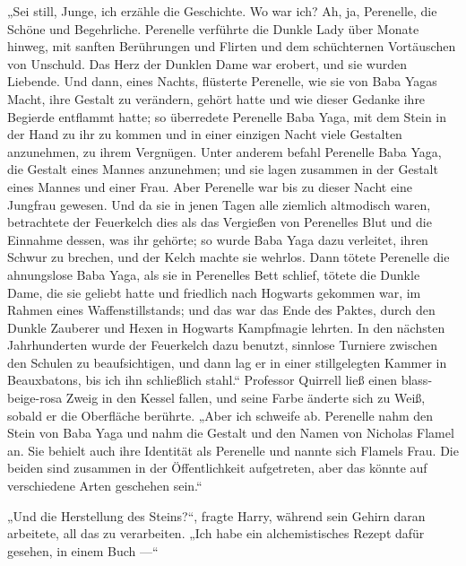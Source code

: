 „Sei still, Junge, ich erzähle die Geschichte. Wo war ich? Ah, ja, Perenelle, die Schöne und Begehrliche. Perenelle verführte die Dunkle Lady über Monate hinweg, mit sanften Berührungen und Flirten und dem schüchternen Vortäuschen von Unschuld. Das Herz der Dunklen Dame war erobert, und sie wurden Liebende. Und dann, eines Nachts, flüsterte Perenelle, wie sie von Baba Yagas Macht, ihre Gestalt zu verändern, gehört hatte und wie dieser Gedanke ihre Begierde entflammt hatte; so überredete Perenelle Baba Yaga, mit dem Stein in der Hand zu ihr zu kommen und in einer einzigen Nacht viele Gestalten anzunehmen, zu ihrem Vergnügen. Unter anderem befahl Perenelle Baba Yaga, die Gestalt eines Mannes anzunehmen; und sie lagen zusammen in der Gestalt eines Mannes und einer Frau. Aber Perenelle war bis zu dieser Nacht eine Jungfrau gewesen. Und da sie in jenen Tagen alle ziemlich altmodisch waren, betrachtete der Feuerkelch dies als das Vergießen von Perenelles Blut und die Einnahme dessen, was ihr gehörte; so wurde Baba Yaga dazu verleitet, ihren Schwur zu brechen, und der Kelch machte sie wehrlos. Dann tötete Perenelle die ahnungslose Baba Yaga, als sie in Perenelles Bett schlief, tötete die Dunkle Dame, die sie geliebt hatte und friedlich nach Hogwarts gekommen war, im Rahmen eines Waffenstillstands; und das war das Ende des Paktes, durch den Dunkle Zauberer und Hexen in Hogwarts Kampfmagie lehrten. In den nächsten Jahrhunderten wurde der Feuerkelch dazu benutzt, sinnlose Turniere zwischen den Schulen zu beaufsichtigen, und dann lag er in einer stillgelegten Kammer in Beauxbatons, bis ich ihn schließlich stahl.“
Professor Quirrell ließ einen blass-beige-rosa Zweig in den Kessel fallen, und seine Farbe änderte sich zu Weiß, sobald er die Oberfläche berührte.
„Aber ich schweife ab. Perenelle nahm den Stein von Baba Yaga und nahm die Gestalt und den Namen von Nicholas Flamel an. Sie behielt auch ihre Identität als Perenelle und nannte sich Flamels Frau. Die beiden sind zusammen in der Öffentlichkeit aufgetreten, aber das könnte auf verschiedene Arten geschehen sein.“

„Und die Herstellung des Steins?“, fragte Harry, während sein Gehirn daran arbeitete, all das zu verarbeiten.
„Ich habe ein alchemistisches Rezept dafür gesehen, in einem Buch —“

